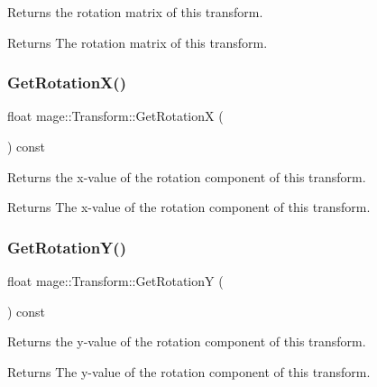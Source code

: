 Returns the rotation matrix of this transform.

\begin{DoxyReturn}{Returns}
The rotation matrix of this transform. 
\end{DoxyReturn}
\hypertarget{structmage_1_1_transform_aaaf300a4a24b976c271ba17c8a41beaf}{}\label{structmage_1_1_transform_aaaf300a4a24b976c271ba17c8a41beaf} 
\subsubsection{\texorpdfstring{Get\+Rotation\+X()}{GetRotationX()}}
{\footnotesize\ttfamily float mage\+::\+Transform\+::\+Get\+RotationX (\begin{DoxyParamCaption}{ }\end{DoxyParamCaption}) const}

Returns the x-\/value of the rotation component of this transform.

\begin{DoxyReturn}{Returns}
The x-\/value of the rotation component of this transform. 
\end{DoxyReturn}
\hypertarget{structmage_1_1_transform_a93ccd53bd0a4e71ab7f42447d482ab86}{}\label{structmage_1_1_transform_a93ccd53bd0a4e71ab7f42447d482ab86} 
\subsubsection{\texorpdfstring{Get\+Rotation\+Y()}{GetRotationY()}}
{\footnotesize\ttfamily float mage\+::\+Transform\+::\+Get\+RotationY (\begin{DoxyParamCaption}{ }\end{DoxyParamCaption}) const}

Returns the y-\/value of the rotation component of this transform.

\begin{DoxyReturn}{Returns}
The y-\/value of the rotation component of this transform. 
\end{DoxyReturn}
\hypertarget{structmage_1_1_transform_ae1dd099e12e6dedadbc31d679343b39a}{}\label{structmage_1_1_transform_ae1dd099e12e6dedadbc31d679343b39a} 
